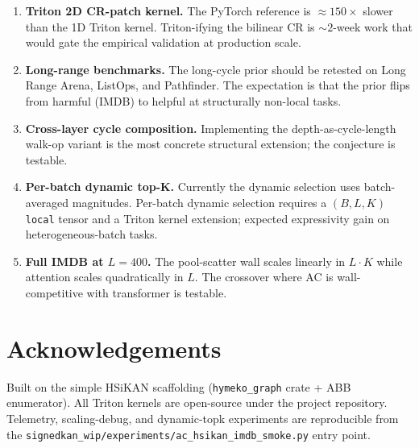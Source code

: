 \documentclass[10pt,a4paper]{article}
\begin{document}
\begin{enumerate}[noitemsep]
\item \textbf{Triton 2D CR-patch kernel.} The PyTorch reference is
      $\approx 150\times$ slower than the 1D Triton kernel. Triton-ifying
      the bilinear CR is $\sim 2$-week work that would gate the
      empirical validation at production scale.
\item \textbf{Long-range benchmarks.} The long-cycle prior should be
      retested on Long Range Arena, ListOps, and Pathfinder. The
      expectation is that the prior flips from harmful (IMDB) to
      helpful at structurally non-local tasks.
\item \textbf{Cross-layer cycle composition.} Implementing the
      depth-as-cycle-length walk-op variant is the most concrete
      structural extension; the conjecture is testable.
\item \textbf{Per-batch dynamic top-K.} Currently the dynamic selection
      uses batch-averaged magnitudes. Per-batch dynamic selection
      requires a $(B, L, K)$ \texttt{local} tensor and a Triton kernel
      extension; expected expressivity gain on heterogeneous-batch tasks.
\item \textbf{Full IMDB at $L = 400$.} The pool-scatter wall scales
      linearly in $L \cdot K$ while attention scales quadratically in
      $L$. The crossover where AC is wall-competitive with transformer
      is testable.
\end{enumerate}

\section*{Acknowledgements}

Built on the simple HSiKAN scaffolding (\texttt{hymeko\_graph} crate
+ ABB enumerator). All Triton kernels are open-source under the
project repository. Telemetry, scaling-debug, and dynamic-topk
experiments are reproducible from the
\texttt{signedkan\_wip/experiments/ac\_hsikan\_imdb\_smoke.py} entry
point.
\end{document}
